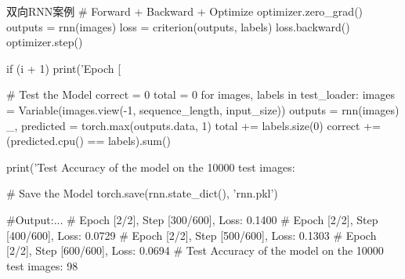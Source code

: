 \documentclass[openbib]{article}
\begin{document}
\begin{Python}{双向RNN案例}
	# Forward + Backward + Optimize
	optimizer.zero_grad()
	outputs = rnn(images)
	loss = criterion(outputs, labels)
	loss.backward()
	optimizer.step()
	
	if (i + 1) %
	print('Epoch [%
	
	# Test the Model
	correct = 0
	total = 0
	for images, labels in test_loader:
	images = Variable(images.view(-1, sequence_length, input_size))
	outputs = rnn(images)
	_, predicted = torch.max(outputs.data, 1)
	total += labels.size(0)
	correct += (predicted.cpu() == labels).sum()
	
	print('Test Accuracy of the model on the 10000 test images: %
	
	# Save the Model
	torch.save(rnn.state_dict(), 'rnn.pkl')
	
	#Output:...
	#       Epoch [2/2], Step [300/600], Loss: 0.1400
	#       Epoch [2/2], Step [400/600], Loss: 0.0729
	#       Epoch [2/2], Step [500/600], Loss: 0.1303
	#       Epoch [2/2], Step [600/600], Loss: 0.0694
	#       Test Accuracy of the model on the 10000 test images: 98 %
\end{Python}	
\end{document}
